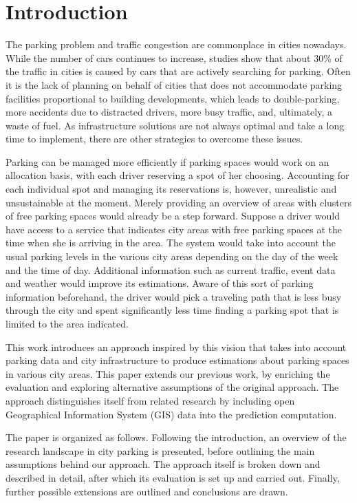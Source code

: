 \documentclass{ws-ijait}
\newcommand{\cmmnt}[1]{\ignorespaces}
\begin{document}
	\cmmnt{TODO abstract}
	\section{Introduction}
	The parking problem and traffic congestion are commonplace in cities nowadays. While the number of cars continues to increase\cmmnt{ref}, studies show that about 30\% of the traffic in cities is caused by cars that are actively searching for parking\cmmnt{ref}. Often it is the lack of planning on behalf of cities that does not accommodate parking facilities proportional to building developments\cmmnt{search ref}, which leads to double-parking, more accidents due to distracted drivers, more busy traffic, and, ultimately, a waste of fuel. As infrastructure solutions are not always optimal and take a long time to implement, there are other strategies to overcome these issues.
	
	Parking can be managed more efficiently if parking spaces would work on an allocation basis, with each driver reserving a spot of her choosing. Accounting for each individual spot and managing its reservations is, however, unrealistic and unsustainable at the moment. Merely providing an overview of areas with clusters of free parking spaces would already be a step forward. Suppose a driver would have access to a service that indicates city areas with free parking spaces at the time when she is arriving in the area. The system would take into account the usual parking levels in the various city areas depending on the day of the week and the time of day. Additional information such as current traffic, event data and weather would improve its estimations. Aware of this sort of parking information beforehand, the driver would pick a traveling path that is less busy through the city and spent significantly less time finding a parking spot that is limited to the area indicated.
	
	This work introduces an approach inspired by this vision that takes into account parking data and city infrastructure to produce estimations about parking spaces in various city areas. This paper extends our previous work\cmmnt{ref}, by enriching the evaluation and exploring alternative assumptions of the original approach. The approach distinguishes itself from related research by including open Geographical Information System (GIS) data into the prediction computation.
	
	The paper is organized as follows. Following the introduction, an overview of the research landscape in city parking is presented, before outlining the main assumptions behind our approach. The approach itself is broken down and described in detail, after which its evaluation is set up and carried out. Finally, further possible extensions are outlined and conclusions are drawn.
\end{document}
